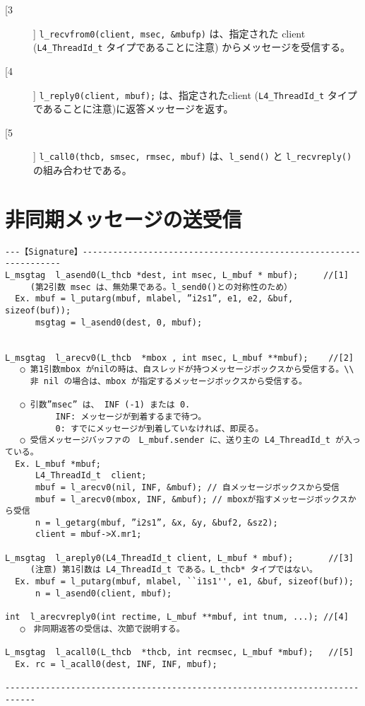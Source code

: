 \begin{description}
\item[[3]]
  \verb|l_recvfrom0(client, msec, &mbufp)| は、指定された client
   (\verb|L4_ThreadId_t| タイプであることに注意)
  からメッセージを受信する。

\item[[4]]
  \verb|l_reply0(client, mbuf);| は、指定されたclient
  (\verb|L4_ThreadId_t| タイプであることに注意)に返答メッセージを返す。

\item[[5]]
  \verb|l_call0(thcb, smsec, rmsec, mbuf)|
   は、\verb|l_send()| と \verb|l_recvreply()|の組み合わせである。

\end{description}


\section{非同期メッセージの送受信}

\begin{verbatim}
---【Signature】------------------------------------------------------------------
L_msgtag  l_asend0(L_thcb *dest, int msec, L_mbuf * mbuf);     //[1]
     (第2引数 msec は、無効果である。l_send0()との対称性のため）
  Ex. mbuf = l_putarg(mbuf, mlabel, ”i2s1”, e1, e2, &buf, sizeof(buf));
      msgtag = l_asend0(dest, 0, mbuf);


L_msgtag  l_arecv0(L_thcb  *mbox , int msec, L_mbuf **mbuf);    //[2]
   ○ 第1引数mbox がnilの時は、自スレッドが持つメッセージボックスから受信する。\\
     非 nil の場合は、mbox が指定するメッセージボックスから受信する。

   ○ 引数”msec” は、 INF (-1) または 0.
          INF: メッセージが到着するまで待つ。
          0: すでにメッセージが到着していなければ、即戻る。
   ○ 受信メッセージバッファの　L_mbuf.sender に、送り主の L4_ThreadId_t が入っている。
  Ex. L_mbuf *mbuf; 
      L4_ThreadId_t  client;
      mbuf = l_arecv0(nil, INF, &mbuf); // 自メッセージボックスから受信
      mbuf = l_arecv0(mbox, INF, &mbuf); // mboxが指すメッセージボックスから受信
      n = l_getarg(mbuf, ”i2s1”, &x, &y, &buf2, &sz2);
      client = mbuf->X.mr1;

L_msgtag  l_areply0(L4_ThreadId_t client, L_mbuf * mbuf);       //[3]
     (注意) 第1引数は L4_ThreadId_t である。L_thcb* タイプではない。
  Ex. mbuf = l_putarg(mbuf, mlabel, ``i1s1'', e1, &buf, sizeof(buf));
      n = l_asend0(client, mbuf);

int  l_arecvreply0(int rectime, L_mbuf **mbuf, int tnum, ...); //[4]
   ○　非同期返答の受信は、次節で説明する。

L_msgtag  l_acall0(L_thcb  *thcb, int recmsec, L_mbuf *mbuf);   //[5]
  Ex. rc = l_acall0(dest, INF, INF, mbuf);

----------------------------------------------------------------------------
\end{verbatim}


